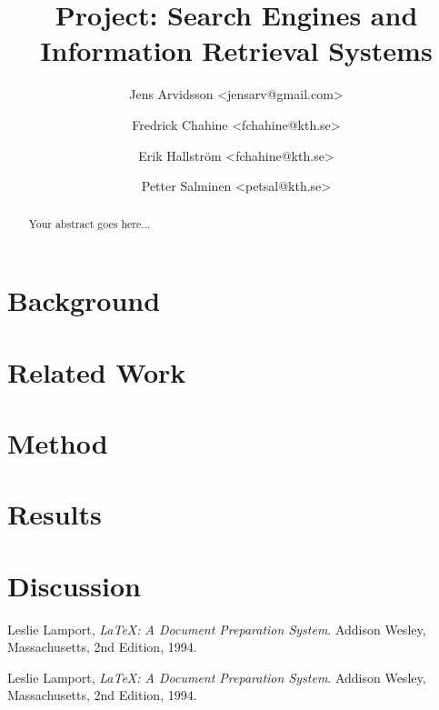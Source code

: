 \documentclass[a4paper,11pt,twoside]{ltxdoc}
\title{Project: Search Engines and Information Retrieval Systems}
\author{
Jens Arvidsson <jensarv@gmail.com> \and
Fredrick Chahine <fchahine@kth.se> \and
Erik Hallström  <fchahine@kth.se> \and
Petter Salminen <petsal@kth.se>}
\begin{document}
\maketitle
\tableofcontents

\newpage
\begin{abstract}
Your abstract goes here...

\end{abstract}

\newpage
\section{Background}

\section{Related Work}

\section{Method}

\section{Results}

\section{Discussion}

\newpage
\begin{thebibliography}{9}

  Leslie Lamport,
  \emph{\LaTeX: A Document Preparation System}.
  Addison Wesley, Massachusetts,
  2nd Edition,
  1994.

  Leslie Lamport,
  \emph{\LaTeX: A Document Preparation System}.
  Addison Wesley, Massachusetts,
  2nd Edition,
  1994.


\end{thebibliography}
\end{document}
